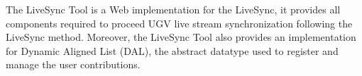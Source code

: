 The LiveSync Tool is a Web implementation for the LiveSync, it provides all components required to proceed UGV live stream synchronization following the LiveSync method. Moreover, the LiveSync Tool also provides an implementation for Dynamic Aligned List (DAL), the abstract datatype used to register and manage the user contributions.
